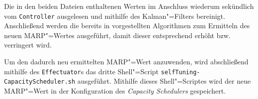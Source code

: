 Die in den beiden Dateien enthaltenen Werten im Anschluss wiederum sekündlich vom \texttt{Controller} ausgelesen und mithilfe des Kalman"=Filters bereinigt.
Anschließend werden die bereits in \cite{zhang2016} vorgestellten Algorithmen zum Ermitteln des neuen \ac{MARP}"=Wertes ausgeführt, damit dieser entsprechend erhöht bzw. verringert wird.

Um den dadurch neu ermittelten \ac{MARP}"=Wert anzuwenden, wird abschließend mithilfe des \texttt{Effectuator}s das dritte Shell"=Script \texttt{selfTuning-CapacityScheduler.sh} ausgeführt.
Mithilfe dieses Shell"=Scriptes wird der neue MARP"=Wert in der Konfiguration des \emph{Capacity Schedulers} gespeichert.
